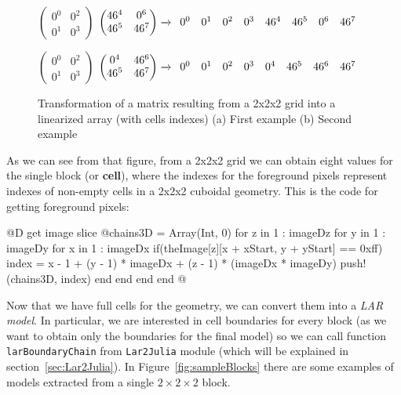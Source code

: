 \documentclass[11pt,oneside]{article}	%
\begin{document}
\begin{figure}[htb] %
   \centering
    $
    \begin{pmatrix}
    0^{0} & 0^{2}\\
    0^{1} & 0^{3}
    \end{pmatrix}
    $
    $
    \begin{pmatrix}
    46^{4} & 0^{6}\\
    46^{5} & 46^{7}
    \end{pmatrix}
    \xrightarrow{}
    \begin{array}{c c c c c c c c}
      0^{0} & 0^{1} & 0^{2} & 0^{3} & 46^{4}  & 46^{5} & 0^{6} & 46^{7} \\
    \end{array}
    $
    
    $
    \begin{pmatrix}
    0^{0} & 0^{2}\\
    0^{1} & 0^{3}
    \end{pmatrix}
    $
    $
   \begin{pmatrix}
    0^{4} & 46^{6}\\
    46^{5} & 46^{7}
    \end{pmatrix}
    \xrightarrow{}
    \begin{array}{c c c c c c c c}
      0^{0} & 0^{1} & 0^{2} & 0^{3} & 0^{4}  & 46^{5} & 46^{6} & 46^{7} \\
    \end{array}
    $
   \hfill
   \caption{Transformation of a matrix resulting from a 2x2x2 grid into a linearized array (with cells indexes) (a) First example (b) Second example}
   \label{fig:linearizedMatrix}
\end{figure}

As we can see from that figure, from a 2x2x2 grid we can obtain eight values for the single block (or \textbf{cell}), where the indexes for the foreground pixels represent indexes of non-empty cells in a 2x2x2 cuboidal geometry.
This is the code for getting foreground pixels:

@D get image slice
@{chains3D = Array(Int, 0)
for z in 1 : imageDz
  for y in 1 : imageDy
    for x in 1 : imageDx
      if(theImage[z][x + xStart, y + yStart] == 0xff)
        index = x - 1 + (y - 1) * imageDx + (z - 1) * (imageDx * imageDy)
	push!(chains3D, index)
      end
    end
  end
end @}

Now that we have full cells for the geometry, we can convert them into a \textit{LAR model}. In particular, we are interested in cell boundaries for every block (as we want to obtain only the boundaries for the final model) so we can call function \texttt{larBoundaryChain} from \texttt{Lar2Julia} module (which will be explained in section~\ref{sec:Lar2Julia}). In Figure~\ref{fig:sampleBlocks} there are some examples of models extracted from a single $2 \times 2 \times 2$ block.
\end{document}
